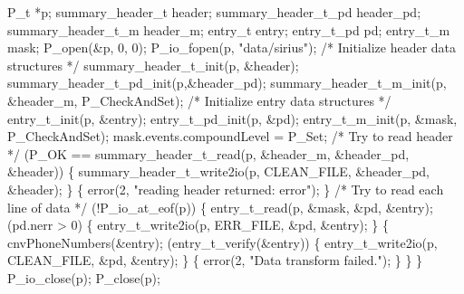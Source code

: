 % 
\begin{centercode}
P\_t                  *p;
summary\_header\_t     header;
summary\_header\_t\_pd  header\_pd;
summary\_header\_t\_m   header\_m;
entry\_t              entry;
entry\_t\_pd           pd;
entry\_t\_m            mask;
\mbox{}
P\_open(&p, 0, 0);
P\_io\_fopen(p, "data/sirius");
\mbox{}
/* Initialize header data structures */
summary\_header\_t\_init(p,   &header);
summary\_header\_t\_pd\_init(p,&header\_pd);
summary\_header\_t\_m\_init(p, &header\_m, P\_CheckAndSet);
\mbox{}
/* Initialize entry data structures */
entry\_t\_init(p,    &entry);
entry\_t\_pd\_init(p, &pd);
entry\_t\_m\_init(p,  &mask, P\_CheckAndSet);
mask.events.compoundLevel = P\_Set;
\mbox{}
/* Try to read header   */
 (P\_OK == summary\_header\_t\_read(p, &header\_m, &header\_pd, &header)) \{
  summary\_header\_t\_write2io(p, CLEAN\_FILE, &header\_pd, &header);
\}  \{
  error(2, "reading header returned: error");
\}
\mbox{}
/* Try to read each line of data  */
 (!P\_io\_at\_eof(p)) \{
  entry\_t\_read(p, &mask, &pd, &entry);
   (pd.nerr > 0) \{
    entry\_t\_write2io(p, ERR\_FILE, &pd, &entry);
  \}  \{
    cnvPhoneNumbers(&entry);
     (entry\_t\_verify(&entry)) \{
      entry\_t\_write2io(p, CLEAN\_FILE, &pd, &entry);
    \}  \{
      error(2, "Data transform failed.");
    \}
  \}
\}
P\_io\_close(p);
P\_close(p);
\end{centercode}
